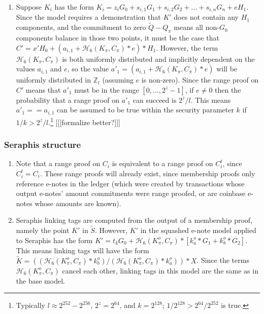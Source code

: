 \begin{appendices}
\begin{enumerate}
    \item Suppose $K_i$ has the form $K_i = z_i G_0 + s_{i,1} G_1 + s_{i,2} G_2 + ... + s_{i,n} G_n + e H_1$. Since the model requires a demonstration that $K'$ does not contain any $H_1$ components, and the commitment to zero $\tilde{Q} - Q_{\pi}$ means all non-$G_0$ components balance in those two points, it must be the case that $C' = x' H_0 + (a_{i,1} + \mathcal{H}_6(K_{\pi}, C_{\pi})*e)*H_1$. However, the term $\mathcal{H}_6(K_{\pi}, C_{\pi})$ is both uniformly distributed and implicitly dependent on the values $a_{i,1}$ and $e$, so the value $a'_1 = (a_{i,1} + \mathcal{H}_6(K_{\pi}, C_{\pi})*e)$ will be uniformly distributed in $\mathbb{Z}_l$ (assuming $e$ is non-zero). Since the range proof on $C'$ means that $a'_1$ must be in the range $[0,...,2^z - 1]$, if $e \neq 0$ then the probability that a range proof on $a'_1$ can succeed is $2^z/l$. This means $a'_1 == a_{i,1}$ can be assumed to be true within the security parameter $k$ if $1/k > 2^z/l$.\footnote{Typically $l \approx 2^{252} - 2^{256}$, $2^z = 2^{64}$, and $k = 2^{128}$; $1/2^{128} > 2^{64}/2^{252}$ is true.} [[[formalize better?]]]
\end{enumerate}

\subsubsection{Seraphis structure}

\begin{enumerate}
    \item Note that a range proof on $C_i$ is equivalent to a range proof on $C^t_i$, since $C^t_i = C_i$. These range proofs will already exist, since membership proofs only reference e-notes in the ledger (which were created by transactions whose output e-notes' amount commitments were range proofed, or are coinbase e-notes whose amounts are known).

    \item Seraphis linking tags are computed from the output of a membership proof, namely the point $K'$ in $\tilde{S}$. However, $K'$ in the squashed e-note model applied to Seraphis has the form $K' = t_k G_0 + \mathcal{H}_6(K^o_{\pi}, C_{\pi})*[k^o_a*G_1 + k^o_b*G_2]$. This means linking tags will have the form $\tilde{K} = ((\mathcal{H}_6(K^o_{\pi}, C_{\pi})*k^o_b)/(\mathcal{H}_6(K^o_{\pi}, C_{\pi})*k^o_a))*X$. Since the terms $\mathcal{H}_6(K^o_{\pi}, C_{\pi})$ cancel each other, linking tags in this model are the same as in the base model.


\end{enumerate}
\end{appendices}

